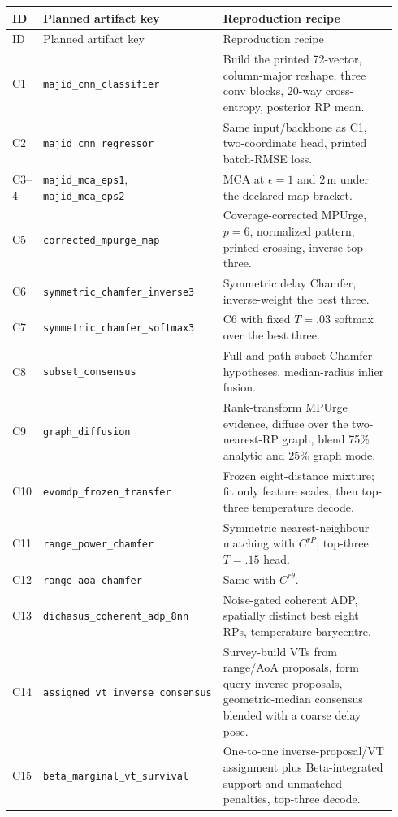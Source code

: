 \documentclass[10pt]{article}
\newcommand{\code}[1]{\nolinkurl{#1}}
\newcommand{\m}{\,\mathrm m}
\begin{document}
\footnotesize
\begin{longtable}{@{}p{0.055\linewidth}p{0.37\linewidth}p{0.52\linewidth}@{}}
\toprule ID & Planned artifact key & Reproduction recipe\\\midrule
\endfirsthead\toprule ID & Planned artifact key & Reproduction recipe\\\midrule\endhead
C1 & \code{majid_cnn_classifier} & Build the printed 72-vector, column-major reshape, three conv blocks, 20-way cross-entropy, posterior RP mean.\\
C2 & \code{majid_cnn_regressor} & Same input/backbone as C1, two-coordinate head, printed batch-RMSE loss.\\
C3--4 & \code{majid_mca_eps1}, \code{majid_mca_eps2} & MCA at $\epsilon=1$ and $2\m$ under the declared map bracket.\\
C5 & \code{corrected_mpurge_map} & Coverage-corrected MPUrge, $p=6$, normalized pattern, printed crossing, inverse top-three.\\
C6 & \code{symmetric_chamfer_inverse3} & Symmetric delay Chamfer, inverse-weight the best three.\\
C7 & \code{symmetric_chamfer_softmax3} & C6 with fixed $T=.03$ softmax over the best three.\\
C8 & \code{subset_consensus} & Full and path-subset Chamfer hypotheses, median-radius inlier fusion.\\
C9 & \code{graph_diffusion} & Rank-transform MPUrge evidence, diffuse over the two-nearest-RP graph, blend 75\% analytic and 25\% graph mode.\\
C10 & \code{evomdp_frozen_transfer} & Frozen eight-distance mixture; fit only feature scales, then top-three temperature decode.\\
C11 & \code{range_power_chamfer} & Symmetric nearest-neighbour matching with $C^{rP}$; top-three $T=.15$ head.\\
C12 & \code{range_aoa_chamfer} & Same with $C^{r\theta}$.\\
C13 & \code{dichasus_coherent_adp_8nn} & Noise-gated coherent ADP, spatially distinct best eight RPs, temperature barycentre.\\
C14 & \code{assigned_vt_inverse_consensus} & Survey-build VTs from range/AoA proposals, form query inverse proposals, geometric-median consensus blended with a coarse delay pose.\\
C15 & \code{beta_marginal_vt_survival} & One-to-one inverse-proposal/VT assignment plus Beta-integrated support and unmatched penalties, top-three decode.\\

\end{longtable}
\end{document}
